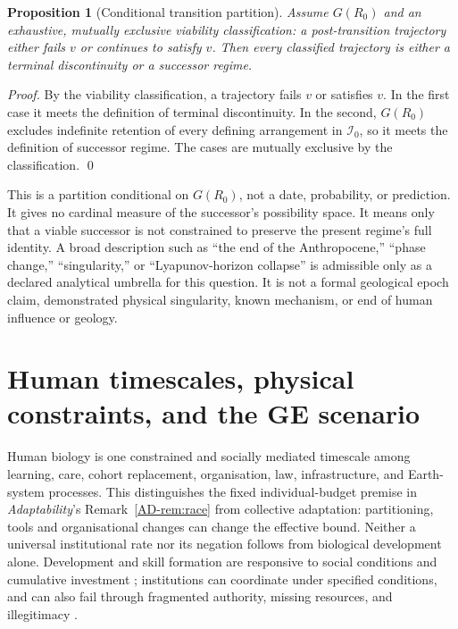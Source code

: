 \documentclass[11pt]{article}
\newtheorem{proposition}[definition]{Proposition}
\begin{document}
\begin{proposition}[Conditional transition partition]\label{prop:fork}
Assume $G(R_0)$ and an exhaustive, mutually exclusive viability classification:
a post-transition trajectory either fails $v$ or continues to satisfy $v$.
Then every classified trajectory is either a terminal discontinuity or a
successor regime.
\end{proposition}
\begin{proof}
By the viability classification, a trajectory fails $v$ or satisfies $v$. In
the first case it meets the definition of terminal discontinuity. In the second,
$G(R_0)$ excludes indefinite retention of every defining arrangement in
$\mathcal{I}_0$, so it meets the definition of successor regime. The cases are
mutually exclusive by the classification. \qed
\end{proof}

This is a partition conditional on $G(R_0)$, not a date, probability, or
prediction. It gives no cardinal measure of the successor's possibility space.
It means only that a viable successor is not constrained to preserve the present
regime's full identity. A broad description such as ``the end of the
Anthropocene,'' ``phase change,'' ``singularity,'' or ``Lyapunov-horizon
collapse'' is admissible only as a declared analytical umbrella for this
question. It is not a formal geological epoch claim, demonstrated physical
singularity, known mechanism, or end of human influence or geology.

\section{Human timescales, physical constraints, and the GE scenario}\label{sec:ge-scenario}

Human biology is one constrained and socially mediated timescale among learning,
care, cohort replacement, organisation, law, infrastructure, and Earth-system
processes. This distinguishes the fixed individual-budget premise in \emph{Adaptability}'s Remark~\ref{AD-rem:race} from collective adaptation: partitioning, tools and organisational changes can change the effective bound. Neither a universal institutional rate nor its negation follows from biological development alone. Development and skill formation are responsive to social conditions
and cumulative investment \citep{nasem2019,heckman2006}; institutions can
coordinate under specified conditions, and can also fail through fragmented
authority, missing resources, and illegitimacy \citep{ostrom1990,ipcc2022wgii}.
\end{document}
